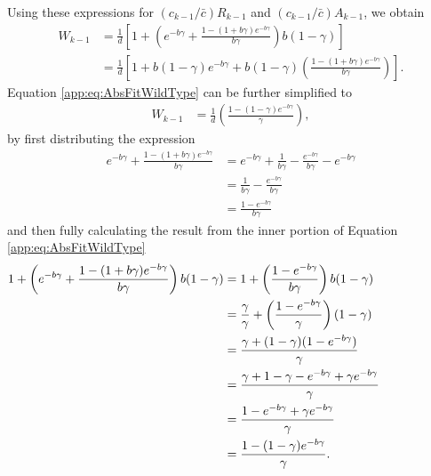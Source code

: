 \documentclass[9pt,twocolumn,twoside,lineno]{gsajnl}
\begin{document}
Using these expressions for $(c_{k-1}/\bar{c})R_{k-1}$ and $(c_{k-1}/\bar{c})A_{k-1}$, we obtain 
\begin{align}
W_{k-1} &=\frac{1}{d}\left[1+\left(e^{-b\gamma} + \frac{1-(1+b\gamma)e^{-b\gamma }}{ b\gamma}\right)b(1-\gamma)\right] \nonumber\\[4pt]
&=\frac{1}{d}\left[1+b(1-\gamma)e^{-b\gamma} + b(1-\gamma)\left(\frac{1-(1+b\gamma)e^{-b\gamma }}{ b\gamma}\right)\right]. \label{app:eq:AbsFitWildType}
\end{align}
Equation \eqref{app:eq:AbsFitWildType} can be further simplified to 
\begin{equation}\label{app:eq:AbsFitWildTypeReduced}
\begin{aligned}
W_{k-1} &=\frac{1}{d}\left(\frac{1-(1-\gamma)e^{-b\gamma}}{\gamma}\right),
\end{aligned}
\end{equation}
by first distributing the expression 
\[
\begin{aligned}
e^{-b\gamma} + \frac{1-(1+b\gamma)e^{-b\gamma }}{ b\gamma} &= e^{-b\gamma} + \frac{1}{b\gamma} -\frac{e^{-b\gamma }}{ b\gamma} -e^{-b\gamma }\\
&=\frac{1}{b\gamma} -\frac{e^{-b\gamma }}{ b\gamma}\\
&=\frac{1-e^{-b\gamma }}{ b\gamma}
\end{aligned}
\]
and then fully calculating the result from the inner portion of Equation \eqref{app:eq:AbsFitWildType} 
\[
\begin{aligned}
1+\left(e^{-b\gamma} + \frac{1-(1+b\gamma)e^{-b\gamma }}{ b\gamma}\right)b(1-\gamma) &= 1+\left( \frac{1-e^{-b\gamma }}{ b\gamma} \right)b(1-\gamma)\hspace{.9in}\\
&= \frac{\gamma}{\gamma} +\left( \frac{1-e^{-b\gamma }}{ \gamma} \right)(1-\gamma)\\
&= \frac{\gamma+(1-\gamma)(1-e^{-b\gamma })}{ \gamma}\\
&= \frac{\gamma+ 1-\gamma-e^{-b\gamma} +\gamma e^{-b\gamma}}{ \gamma}\\
&= \frac{1-e^{-b\gamma}+\gamma e^{-b\gamma}}{ \gamma}\\
&= \frac{1-(1-\gamma )e^{-b\gamma}}{ \gamma}.\\
\end{aligned}
\]
\end{document}

